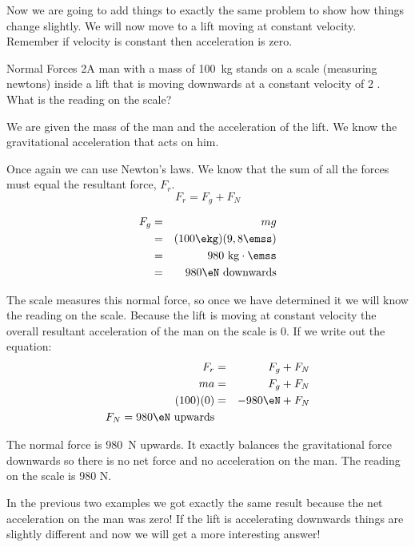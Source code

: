 Now we are going to add things to exactly the same problem to show how things change slightly. We will now move to a lift moving at constant velocity. Remember if velocity is constant then acceleration is zero.

\begin{wex}{Normal Forces 2}{A man with a mass of 100~kg stands on a scale (measuring newtons) inside a lift that is moving downwards at a constant velocity of 2 \ms. What is the reading on the scale?}
{
We are given the mass of the man and the acceleration of the lift. We know the gravitational acceleration that acts on him.

Once again we can use Newton's laws. We know that the sum of all the forces must equal the resultant force, $F_r$.
\begin{equation*}
F_r=F_g+F_N
\end{equation*}

\begin{eqnarray*}
F_g&=&mg \\
&=& (100\ekg)(9,8\emss)\\
&=& 980\ \mathrm{kg\cdot\emss} \\
&=& 980\eN\ \mathrm{downwards}
\end{eqnarray*}

The scale measures this normal force, so once we have determined it we will know the reading on the scale. Because the lift is moving at constant velocity the overall resultant acceleration of the man on the scale is $0$. If we write out the equation:
\begin{eqnarray*}
F_r&=&F_g+F_N \\
ma&=&F_g+F_N \\
(100)(0) &=& -980\eN +F_N\\
F_N = 980\eN\ \mathrm{upwards}
\end{eqnarray*}

The normal force is 980~N upwards. It exactly balances the gravitational force downwards so there is no net force and no acceleration on the man. The reading on the scale is 980 N.}
\end{wex}

In the previous two examples we got exactly the same result because the net acceleration on the man was zero! If the lift is accelerating downwards things are slightly different and now we will get a more interesting answer!

